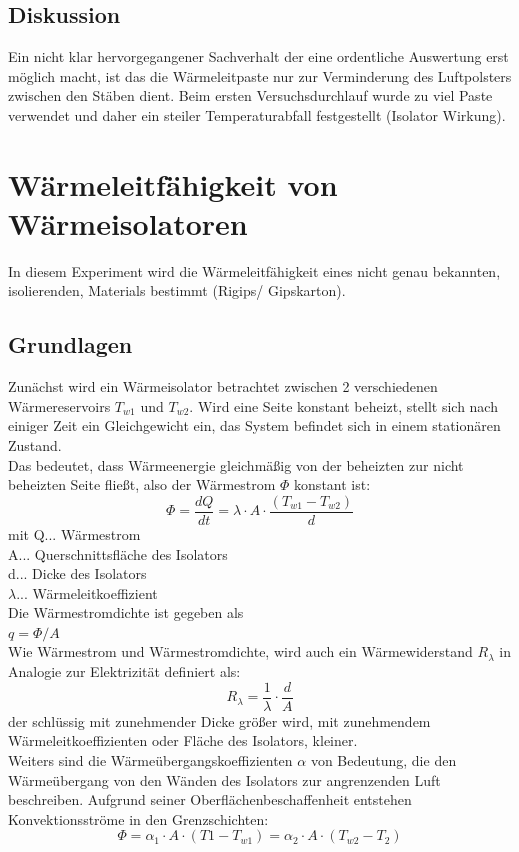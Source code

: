 \documentclass[12pt,a4paper]{article}
\begin{document}
\begin{multicols}{2}

\subsection{Diskussion}
Ein nicht klar hervorgegangener Sachverhalt der eine ordentliche Auswertung erst möglich macht, ist das die Wärmeleitpaste nur zur Verminderung des Luftpolsters zwischen den Stäben dient. Beim ersten Versuchsdurchlauf wurde zu viel Paste verwendet und daher ein steiler Temperaturabfall festgestellt (Isolator Wirkung).\\



\section{Wärmeleitfähigkeit von Wärmeisolatoren}
In diesem Experiment wird die Wärmeleitfähigkeit eines nicht genau bekannten, isolierenden, Materials bestimmt (Rigips/ Gipskarton).

\subsection{Grundlagen}
Zunächst wird ein Wärmeisolator betrachtet zwischen 2 verschiedenen Wärmereservoirs $T_{w1}$ und $T_{w2}$. Wird eine Seite konstant beheizt, stellt sich nach einiger Zeit ein Gleichgewicht ein, das System befindet sich in einem stationären Zustand.\\
Das bedeutet, dass Wärmeenergie gleichmäßig von der beheizten zur nicht beheizten Seite fließt, also der Wärmestrom $\Phi$ konstant ist:
$$\Phi=\frac{dQ}{dt}=\lambda \cdot A \cdot \frac{(T_{w1}-T_{w2})}{d}$$
mit Q... Wärmestrom\\
A... Querschnittsfläche des Isolators\\
d... Dicke des Isolators\\
$\lambda$... Wärmeleitkoeffizient\\
Die Wärmestromdichte ist gegeben als\\
$q=\Phi/A$\\
Wie Wärmestrom und Wärmestromdichte, wird auch ein Wärmewiderstand $R_{\lambda}$ in Analogie zur Elektrizität definiert als:
$$R_{\lambda}=\frac{1}{\lambda}\cdot \frac{d}{A} $$
der schlüssig mit zunehmender Dicke größer wird, mit zunehmendem Wärmeleitkoeffizienten oder Fläche des Isolators, kleiner.\\
Weiters sind die Wärmeübergangskoeffizienten $\alpha$ von Bedeutung, die den Wärmeübergang von den Wänden des Isolators zur angrenzenden Luft beschreiben. Aufgrund seiner Oberflächenbeschaffenheit entstehen Konvektionsströme in den Grenzschichten:
$$\Phi = \alpha_1 \cdot A \cdot (T1-T_{w1}) = \alpha_2 \cdot A \cdot (T_{w2}-T_2) $$


\end{multicols}
\end{document}
